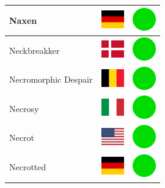 \documentclass[12pt, a4paper, twoside]{report}
\begin{document}
\begin{center}
\begin{longtable}{|p{5cm}|p{2cm}|p{2cm}|}
 Naxen                                                      & \includegraphics[width=1cm]{../img/flags/de} &   \includegraphics[width=1cm]{../likes/y} \\ \hline
 Neckbreakker                                               & \includegraphics[width=1cm]{../img/flags/dk} &   \includegraphics[width=1cm]{../likes/y} \\ \hline
 Necromorphic Despair                                       & \includegraphics[width=1cm]{../img/flags/be} &   \includegraphics[width=1cm]{../likes/y} \\ \hline
 Necrosy                                                    & \includegraphics[width=1cm]{../img/flags/it} &   \includegraphics[width=1cm]{../likes/y} \\ \hline
 Necrot                                                     & \includegraphics[width=1cm]{../img/flags/us} &   \includegraphics[width=1cm]{../likes/y} \\ \hline
 Necrotted                                                  & \includegraphics[width=1cm]{../img/flags/de} &   \includegraphics[width=1cm]{../likes/y} \\ \hline

\end{longtable}
\end{center}
\end{document}
